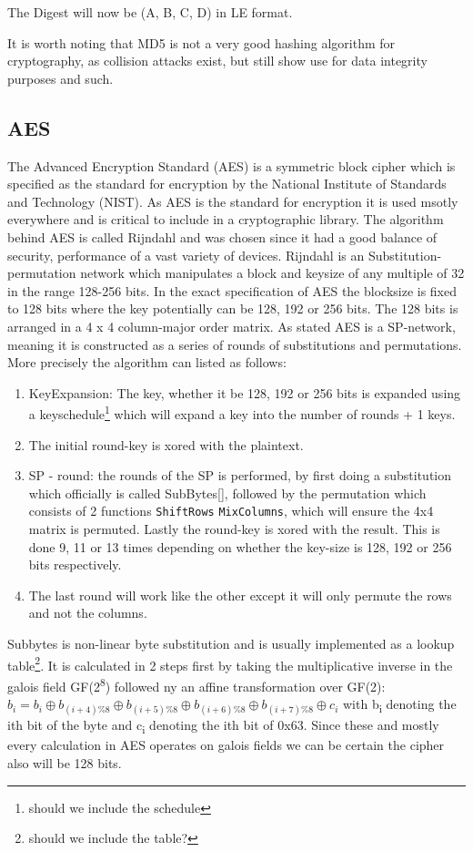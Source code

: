 \documentclass[a4paper]{article}
\begin{document}
The Digest will now be (A, B, C, D) in LE format.

It is worth noting that MD5 is not a very good hashing algorithm for cryptography, as collision attacks exist, but still show use for data integrity purposes and such.
\subsection{AES}
\label{AESalg}
The Advanced Encryption Standard (AES) is a symmetric block cipher which is specified as the standard for encryption by the National Institute of Standards and Technology (NIST). As AES is the standard for encryption it is used msotly everywhere and is critical to include in a cryptographic library. The algorithm behind AES is called Rijndahl and was chosen since it had a good balance of security, performance of a vast variety of devices. Rijndahl is an Substitution-permutation network which manipulates a block and keysize of any multiple of 32 in the range 128-256 bits. In the exact specification of AES the blocksize is fixed to 128 bits where the key potentially can be 128, 192 or 256 bits. The 128 bits is arranged in a 4 x 4 column-major order matrix. As stated AES is a SP-network, meaning it is constructed as a series of rounds of substitutions and permutations. More precisely the algorithm can listed as follows:
\begin{enumerate}
\item KeyExpansion: The key, whether it be 128, 192 or 256 bits is expanded using a keyschedule\footnote{should we include the schedule} which will expand a key into the number of rounds + 1 keys.
\item The initial round-key is xored with the plaintext.
\item SP - round: the rounds of the SP is performed, by first doing a substitution which officially is called SubBytes\ref{}, followed by the permutation which consists of 2 functions \texttt{ShiftRows} \texttt{MixColumns}, which will ensure the 4x4 matrix is permuted. Lastly the round-key is xored with the result. This is done 9, 11 or 13 times depending on whether the key-size is 128, 192 or 256 bits respectively.
\item The last round will work like the other except it will only permute the rows and not the columns.
\end{enumerate}

Subbytes is non-linear byte substitution and is usually implemented as a lookup table\footnote{should we include the table?}. It is calculated in 2 steps first by taking the multiplicative inverse in the galois field GF(2\textsuperscript{8}) followed ny an affine transformation over GF(2):
\(b_i = b_i \oplus b_{(i+4) \% 8} \oplus b_{(i+5) \% 8} \oplus b_{(i+6) \% 8} \oplus b_{(i+7) \% 8} \oplus c_i\) with b\textsubscript{i} denoting the ith bit of the byte and c\textsubscript{i} denoting the ith bit of 0x63. Since these and mostly every calculation in AES operates on galois fields we can be certain the cipher also will be 128 bits.
\end{document}
